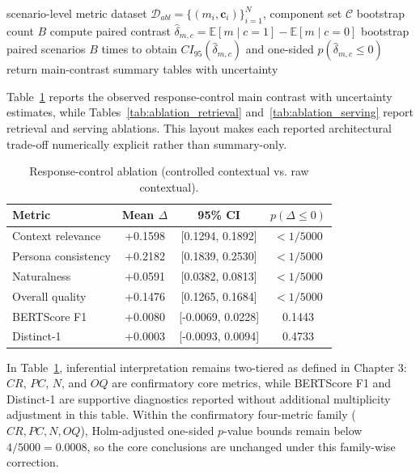﻿\documentclass[a4paper,12pt]{article}
\newcommand{\BootstrapSamples}{5000}
\begin{document}
\begin{algorithm}[H]
\caption{Main-contrast ablation effect estimation}
\begin{algorithmic}[1]
\Require scenario-level metric dataset \(\mathcal{D}_{abl}=\{(m_i,\mathbf{c}_i)\}_{i=1}^{N}\), component set \(\mathcal{C}\)
\Require bootstrap count \(B\)
    \State compute paired contrast \(\hat{\delta}_{m,c}=\mathbb{E}[m\mid c{=}1]-\mathbb{E}[m\mid c{=}0]\)
    \State bootstrap paired scenarios \(B\) times to obtain \(CI_{95}(\hat{\delta}_{m,c})\) and one-sided \(p(\hat{\delta}_{m,c}\le0)\)
  \EndFor
\EndFor
\State return main-contrast summary tables with uncertainty
\end{algorithmic}
\end{algorithm}

Table~\ref{tab:ablation_response_control} reports the observed response-control main contrast with uncertainty estimates, while Tables~\ref{tab:ablation_retrieval} and~\ref{tab:ablation_serving} report retrieval and serving ablations. This layout makes each reported architectural trade-off numerically explicit rather than summary-only.

\begin{table}[t]
\centering
\caption{Response-control ablation (controlled contextual vs. raw contextual).}
\label{tab:ablation_response_control}
\begingroup
\footnotesize
\setlength{\tabcolsep}{4pt}
\begin{tabular}{lccc}
\toprule
Metric & Mean \(\Delta\) & 95\% CI & \(p(\Delta\le0)\) \\
\midrule
Context relevance & +0.1598 & [0.1294, 0.1892] & \(<1/\BootstrapSamples\) \\
Persona consistency & +0.2182 & [0.1839, 0.2530] & \(<1/\BootstrapSamples\) \\
Naturalness & +0.0591 & [0.0382, 0.0813] & \(<1/\BootstrapSamples\) \\
Overall quality & +0.1476 & [0.1265, 0.1684] & \(<1/\BootstrapSamples\) \\
BERTScore F1 & +0.0080 & [-0.0069, 0.0228] & 0.1443 \\
Distinct-1 & +0.0003 & [-0.0093, 0.0094] & 0.4733 \\
\bottomrule
\end{tabular}
\endgroup
\end{table}

In Table~\ref{tab:ablation_response_control}, inferential interpretation remains two-tiered as defined in Chapter 3: \(CR\), \(PC\), \(N\), and \(OQ\) are confirmatory core metrics, while BERTScore F1 and Distinct-1 are supportive diagnostics reported without additional multiplicity adjustment in this table.
Within the confirmatory four-metric family (\(CR,PC,N,OQ\)), Holm-adjusted one-sided \(p\)-value bounds remain below \(4/\BootstrapSamples=0.0008\), so the core conclusions are unchanged under this family-wise correction.
\end{document}
